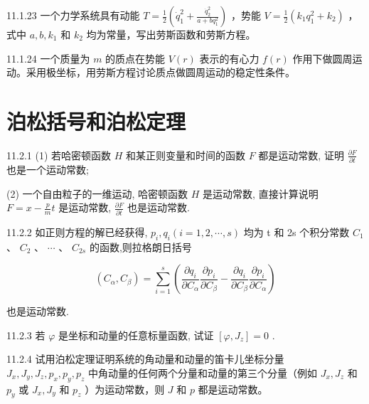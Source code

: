 \begin{problem}{11.1.23}
一个力学系统具有动能 $T = \frac{1}{2}\left(\dot{q}_1^2 +\frac{\dot{q}_2^2}{a + bq_1^2}\right)$ ，势能 $V = \frac{1}{2} (k_1q_1^2 +k_2)$ ，式中 $a,b,k_{1}$ 和 $k_{2}$ 均为常量，写出劳斯函数和劳斯方程。
\end{problem}
\clearpage


\begin{problem}{11.1.24}
一个质量为 $m$ 的质点在势能 $V(r)$ 表示的有心力 $f(r)$ 作用下做圆周运动。采用极坐标，用劳斯方程讨论质点做圆周运动的稳定性条件。
\end{problem}
\clearpage


\section{泊松括号和泊松定理}

\begin{problem}{11.2.1}
(1) 若哈密顿函数 $H$ 和某正则变量和时间的函数 $F$ 都是运动常数, 证明 $\frac{\partial F}{\partial t}$ 也是一个运动常数;

(2) 一个自由粒子的一维运动, 哈密顿函数 $H$ 是运动常数, 直接计算说明 $F = x - \frac{p}{m} t$ 是运动常数, $\frac{\partial F}{\partial t}$ 也是运动常数.
\end{problem}
\clearpage


\begin{problem}{11.2.2}
如正则方程的解已经获得, $p_{i},q_{i}(i=1,2,\cdots,s)$ 均为 t 和 2s 个积分常数 $C_{1}$ 、 $C_{2}$ 、 $\cdots$ 、 $C_{2s}$ 的函数,则拉格朗日括号

\[
(C _ {\alpha}, C _ {\beta}) = \sum_ {i = 1} ^ {s} \left(\frac {\partial q _ {i}}{\partial C _ {\alpha}} \frac {\partial p _ {i}}{\partial C _ {\beta}} - \frac {\partial q _ {i}}{\partial C _ {\beta}} \frac {\partial p _ {i}}{\partial C _ {\alpha}}\right)
\]

也是运动常数.
\end{problem}
\clearpage


\begin{problem}{11.2.3}
若 $\varphi$ 是坐标和动量的任意标量函数, 试证 $[\varphi, J_{z}] = 0$ .
\end{problem}
\clearpage


\begin{problem}{11.2.4}
试用泊松定理证明系统的角动量和动量的笛卡儿坐标分量 $J_{x}, J_{y}, J_{z}, p_{x}, p_{y}, p_{z}$ 中角动量的任何两个分量和动量的第三个分量（例如 $J_{x}, J_{z}$ 和 $p_{y}$ 或 $J_{x}, J_{y}$ 和 $p_{z}$ ）为运动常数，则 $J$ 和 $p$ 都是运动常数。
\end{problem}
\clearpage


